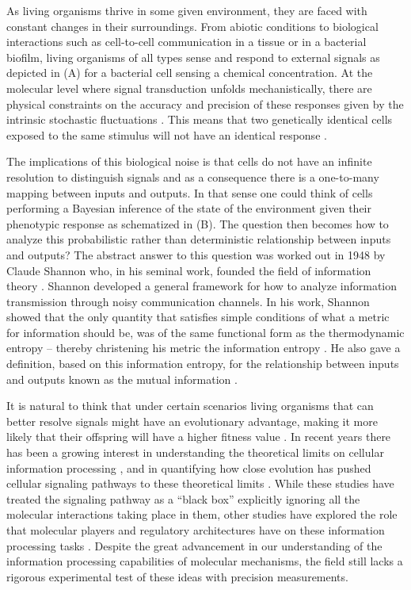 As living organisms thrive in some given environment, they are faced with
constant changes in their surroundings. From abiotic conditions to biological
interactions such as cell-to-cell communication in a tissue or in a bacterial
biofilm, living organisms of all types sense and respond to external signals as
depicted in (A) for a bacterial cell sensing a chemical
concentration. At the molecular level where signal transduction unfolds
mechanistically, there are physical constraints on the accuracy and precision of
these responses given by the intrinsic stochastic fluctuations
\cite{Nemenman2010}. This means that two genetically identical cells exposed to
the same stimulus will not have an identical response \cite{Eldar2010}.

The implications of this biological noise is that cells do not have an infinite
resolution to distinguish signals and as a consequence there is a one-to-many
mapping between inputs and outputs. In that sense one could think of cells
performing a Bayesian inference of the state of the environment given their
phenotypic response as schematized in (B). The question then
becomes how to analyze this probabilistic rather than deterministic relationship
between inputs and outputs? The abstract answer to this question was worked out
in 1948 by Claude Shannon who, in his seminal work, founded the field of
information theory \cite{Shannon1948}. Shannon developed a general framework for
how to analyze information transmission through noisy communication channels. In
his work, Shannon showed that the only quantity that satisfies simple conditions
of what a metric for information should be, was of the same functional form as
the thermodynamic entropy -- thereby christening his metric the information
entropy \cite{MacKay2003}. He also gave a definition, based on this information
entropy, for the relationship between inputs and outputs known as the mutual
information .

It is natural to think that under certain scenarios living organisms that can
better resolve signals might have an evolutionary advantage, making it more
likely that their offspring will have a higher fitness value \cite{Taylor2007a}.
In recent years there has been a growing interest in understanding the
theoretical limits on cellular information processing \cite{Bialek2005,
Gregor2007}, and in quantifying how close evolution has pushed cellular
signaling pathways to these theoretical limits \cite{Tkacik2008, Dubuis2013,
Petkova2016}. While these studies have treated the signaling pathway as a
``black box'' explicitly ignoring all the molecular interactions taking place in
them, other studies have explored the role that molecular players and regulatory
architectures have on these information processing tasks \cite{Rieckh2014,
Ziv2007, Voliotis2014, Tostevin2009, Tkacik2011, Tkacik2008a, Tabbaa2014}.
Despite the great advancement in our understanding of the information
processing capabilities of molecular mechanisms, the field still lacks a
rigorous experimental test of these ideas with precision measurements.

